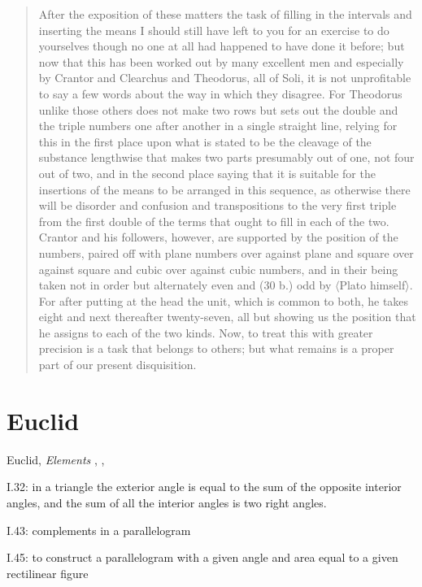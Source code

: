 \documentclass{article}
\theoremstyle{definition}
\begin{document}
\begin{quote}
After the exposition of these matters the task of filling in the intervals and inserting the means I should still have left to you for an exercise to do yourselves though no one at all had
happened to have done it before; but now that this has been worked out by many excellent men and especially by Crantor and Clearchus and Theodorus, all of Soli, it is not 
unprofitable to say a few words about the way in which they disagree. For Theodorus unlike those others does not make two rows but sets out the double and the triple numbers one 
after another in a single straight line, relying for this in the first place
upon what is stated to be the cleavage of the substance lengthwise that makes two parts presumably out of one, not four out of two, and in the second place saying that it is suitable
for the insertions of the means to be arranged in this sequence, as otherwise there will be disorder and confusion and transpositions to the very first triple from the first double of the
terms that ought to fill in each of the two. Crantor and his followers, however, are supported by the position of the numbers, paired off with plane numbers over against plane and
square over against square and cubic over against cubic numbers, and
in their being taken not in order but alternately even and (30 b.) odd by {$\langle$}Plato himself{$\rangle$}. For after
putting at the head the unit, which is common to both, he takes eight and next thereafter twenty-seven, all but showing us the position that he assigns to each of the two kinds.
Now, to treat this with greater precision is a task that belongs to others; but what remains is a proper part of our present disquisition.
\end{quote}








\section{Euclid}
Euclid, {\em Elements} \cite{euclidI}, \cite{euclidII}, \cite{euclidIII}

I.32: in a triangle the exterior angle is equal to the sum of the opposite interior angles, and the sum of all the interior angles is two right angles.

I.43: complements in a parallelogram

I.45: to construct a parallelogram with a given angle and area equal to a given rectilinear figure
\end{document}
